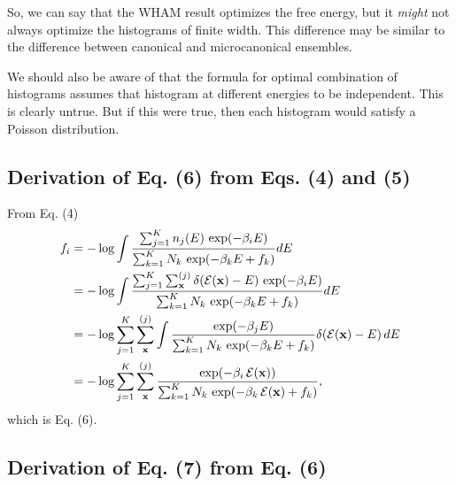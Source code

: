 \documentclass[aip,jcp,preprint,notitlepage, superscriptaddress]{revtex4-1}
\begin{document}
So, we can say that the WHAM result
optimizes the free energy,
but it \emph{might} not always optimize
the histograms of finite width.
%
This difference may be
similar to the difference between canonical and microcanonical ensembles.


We should also be aware of
that the formula for optimal combination of histograms
assumes that histogram at different energies
to be independent.
%
This is clearly untrue.
%
But if this were true,
then each histogram would
satisfy a Poisson distribution.



\subsection{Derivation of Eq. (6) from Eqs. (4) and (5)}



From Eq. (4)
\begin{align*}
f_i
&=
-\log
  \int
    \frac{
      \sum_{j = 1}^K n_j(E) \, \exp(-\beta_i E)
    }
    {
      \sum_{k = 1}^K N_k \, \exp(-\beta_k E + f_k)
    }
    dE
\\
&=
-\log
  \int
    \frac{
      \sum_{j = 1}^K \sum_{\bm{\mathrm{x}}}^{(j)}
      \delta(\mathcal{E}(\bm{\mathrm{x}}) - E) \, \exp(-\beta_i E)
    }
    {
      \sum_{k = 1}^K N_k \, \exp(-\beta_k E + f_k)
    }
    dE
\\
&=
-\log
  \sum_{j = 1}^K \sum_{\bm{\mathrm{x}}}^{(j)}
  \int
    \frac{
      \exp(-\beta_j E)
    }
    {
      \sum_{k = 1}^K N_k \, \exp(-\beta_k E + f_k)
    }
    \delta(\mathcal{E}(\bm{\mathrm{x}}) - E) \, dE
\\
&=
-\log
  \sum_{j = 1}^K \sum_{\bm{\mathrm{x}}}^{(j)}
    \frac{
      \exp(-\beta_i \, \mathcal{E}(\bm{\mathrm{x}}))
    }
    {
      \sum_{k = 1}^K N_k \, \exp(-\beta_k \, \mathcal{E}(\bm{\mathrm{x}}) + f_k)
    },
\end{align*}
which is Eq. (6).



\subsection{Derivation of Eq. (7) from Eq. (6)}
\end{document}
